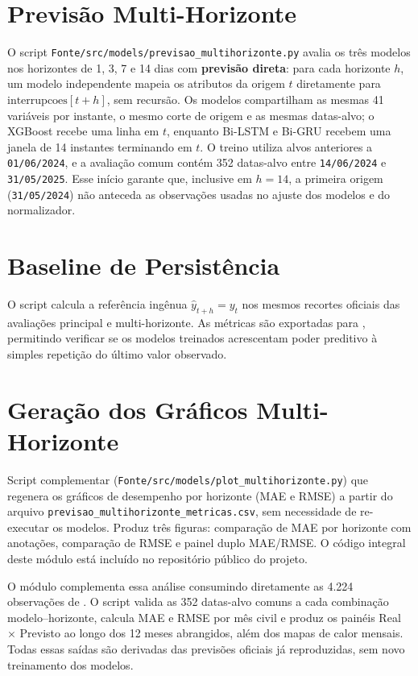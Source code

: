 \section{Previsão Multi-Horizonte}
O script \texttt{Fonte/src/models/previsao\_multihorizonte.py} avalia os três modelos nos horizontes de 1, 3, 7 e 14 dias com \textbf{previsão direta}: para cada horizonte $h$, um modelo independente mapeia os atributos da origem $t$ diretamente para $\text{interrupcoes}[t+h]$, sem recursão. Os modelos compartilham as mesmas 41 variáveis por instante, o mesmo corte de origem e as mesmas datas-alvo; o XGBoost recebe uma linha em $t$, enquanto Bi-LSTM e Bi-GRU recebem uma janela de 14 instantes terminando em $t$. O treino utiliza alvos anteriores a \texttt{01/06/2024}, e a avaliação comum contém 352 datas-alvo entre \texttt{14/06/2024} e \texttt{31/05/2025}. Esse início garante que, inclusive em $h=14$, a primeira origem (\texttt{31/05/2024}) não anteceda as observações usadas no ajuste dos modelos e do normalizador.

\section{Baseline de Persistência}
O script  calcula a referência ingênua $\hat{y}_{t+h}=y_t$ nos mesmos recortes oficiais das avaliações principal e multi-horizonte. As métricas são exportadas para , permitindo verificar se os modelos treinados acrescentam poder preditivo à simples repetição do último valor observado.

\section{Geração dos Gráficos Multi-Horizonte}
Script complementar (\texttt{Fonte/src/models/plot\_\-multi\-horizonte.py}) que regenera os gráficos de desempenho por horizonte (MAE e RMSE) a partir do arquivo \texttt{previsao\_\-multi\-horizonte\_\-metricas.csv}, sem necessidade de re-executar os modelos. Produz três figuras: comparação de MAE por horizonte com anotações, comparação de RMSE e painel duplo MAE/RMSE. O código integral deste módulo está incluído no repositório público do projeto.

O módulo  complementa essa análise consumindo diretamente as 4.224 observações de . O script valida as 352 datas-alvo comuns a cada combinação modelo--horizonte, calcula MAE e RMSE por mês civil e produz os painéis Real $\times$ Previsto ao longo dos 12 meses abrangidos, além dos mapas de calor mensais. Todas essas saídas são derivadas das previsões oficiais já reproduzidas, sem novo treinamento dos modelos.

